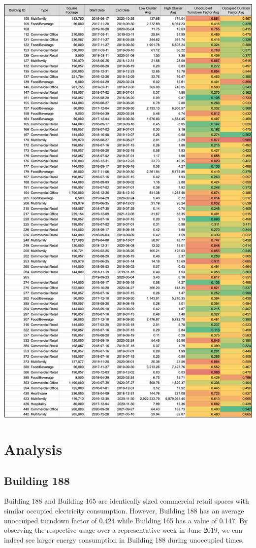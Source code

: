 \documentclass[a4paper]{article}
\begin{document}
\includegraphics[width=\columnwidth]{./images/KPI_Result_Table.png}

\section{Analysis}

\subsection{Building 188}

Building 188 and Building 165 are identically sized commercial retail spaces with similar occupied electricity consumption. However, Building 188 has an average unoccuiped turndown factor of 0.424 while Building 165 has a value of 0.147. By observing the respective usage over a representative week in June 2019, we can indeed see larger energy consumption in Building 188 during unoccupied times.
\end{document}
